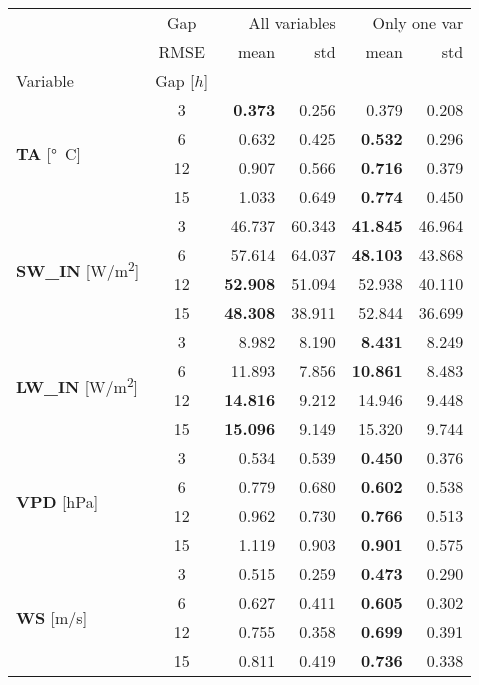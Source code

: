 \begin{table}
\centering
\begin{tabular}{p{2.1cm}c|rr|rr}
\toprule
 & Gap & \multicolumn{2}{r}{All variables} & \multicolumn{2}{r}{Only one var} \\
 & RMSE & mean & std & mean & std \\
Variable & Gap [$h$] &  &  &  &  \\
\midrule
\multirow[c]{4}{*}{\parbox{2.1cm}{\textbf{TA} [\si{°C}]}} & 3 & \bfseries 0.373 & 0.256 & 0.379 & 0.208 \\
 & 6 & 0.632 & 0.425 & \bfseries 0.532 & 0.296 \\
 & 12 & 0.907 & 0.566 & \bfseries 0.716 & 0.379 \\
 & 15 & 1.033 & 0.649 & \bfseries 0.774 & 0.450 \\
\cline{1-6}
\multirow[c]{4}{*}{\parbox{2.1cm}{\textbf{SW\_IN} [\si{W/m^2}]}} & 3 & 46.737 & 60.343 & \bfseries 41.845 & 46.964 \\
 & 6 & 57.614 & 64.037 & \bfseries 48.103 & 43.868 \\
 & 12 & \bfseries 52.908 & 51.094 & 52.938 & 40.110 \\
 & 15 & \bfseries 48.308 & 38.911 & 52.844 & 36.699 \\
\cline{1-6}
\multirow[c]{4}{*}{\parbox{2.1cm}{\textbf{LW\_IN} [\si{W/m^2}]}} & 3 & 8.982 & 8.190 & \bfseries 8.431 & 8.249 \\
 & 6 & 11.893 & 7.856 & \bfseries 10.861 & 8.483 \\
 & 12 & \bfseries 14.816 & 9.212 & 14.946 & 9.448 \\
 & 15 & \bfseries 15.096 & 9.149 & 15.320 & 9.744 \\
\cline{1-6}
\multirow[c]{4}{*}{\parbox{2.1cm}{\textbf{VPD} [\si{hPa}]}} & 3 & 0.534 & 0.539 & \bfseries 0.450 & 0.376 \\
 & 6 & 0.779 & 0.680 & \bfseries 0.602 & 0.538 \\
 & 12 & 0.962 & 0.730 & \bfseries 0.766 & 0.513 \\
 & 15 & 1.119 & 0.903 & \bfseries 0.901 & 0.575 \\
\cline{1-6}
\multirow[c]{4}{*}{\parbox{2.1cm}{\textbf{WS} [\si{m/s}]}} & 3 & 0.515 & 0.259 & \bfseries 0.473 & 0.290 \\
 & 6 & 0.627 & 0.411 & \bfseries 0.605 & 0.302 \\
 & 12 & 0.755 & 0.358 & \bfseries 0.699 & 0.391 \\
 & 15 & 0.811 & 0.419 & \bfseries 0.736 & 0.338 \\

\end{tabular}
\end{table}
